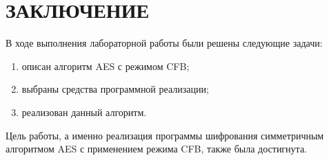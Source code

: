 \chapter*{ЗАКЛЮЧЕНИЕ}

В ходе выполнения лабораторной работы были решены следующие задачи:

\begin{enumerate}[label={\arabic*)}]
	\item описан алгоритм AES с режимом CFB;
	\item выбраны средства программной реализации;
	\item реализован данный алгоритм.
\end{enumerate}

Цель работы, а именно реализация программы шифрования симметричным алгоритмом AES с применением режима CFB, также была достигнута.
